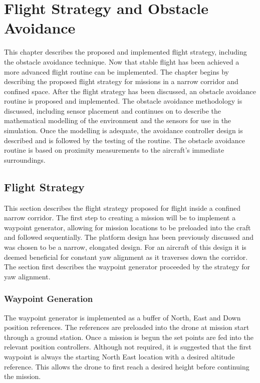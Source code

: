 \chapter{Flight Strategy and Obstacle Avoidance}
	
	This chapter describes the proposed and implemented flight strategy, including the obstacle avoidance technique. Now that stable flight has been achieved a more advanced flight routine can be implemented. The chapter begins by describing the proposed flight strategy for missions in a narrow corridor and confined space. After the flight strategy has been discussed, an obstacle avoidance routine is proposed and implemented. The obstacle avoidance methodology is discussed, including sensor placement and continues on to describe the mathematical modelling of the environment and the sensors for use in the simulation. Once the modelling is adequate, the avoidance controller design is described and is followed by the testing of the routine. The obstacle avoidance routine is based on proximity measurements to the aircraft's immediate surroundings.
	
	\section{Flight Strategy}
	This section describes the flight strategy proposed for flight inside a confined narrow corridor. The first step to creating a mission will be to implement a waypoint generator, allowing for mission locations to be preloaded into the craft and followed sequentially. The platform design has been previously discussed and was chosen to be a narrow, elongated design. For an aircraft of this design it is deemed beneficial for constant yaw alignment as it traverses down the corridor. The section first describes the waypoint generator proceeded by the strategy for yaw alignment.
	
		\subsection{Waypoint Generation}
		The waypoint generator is implemented as a buffer of North, East and Down position references. The references are preloaded into the drone at mission start through a ground station. Once a mission is begun the set points are fed into the relevant position controllers. Although not required, it is suggested that the first waypoint is always the starting North East location with a desired altitude reference. This allows the drone to first reach a desired height before continuing the mission.
		
